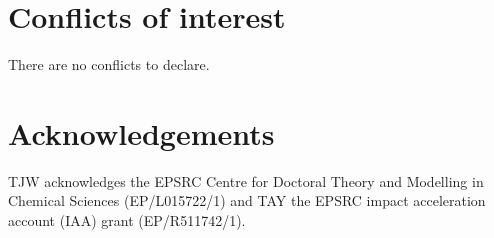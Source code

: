 \documentclass[twoside,twocolumn,9pt]{article}
\renewcommand{\refname}{Notes and references}
\begin{document}
\section*{Conflicts of interest}
There are no conflicts to declare.

\section*{Acknowledgements}
TJW acknowledges the EPSRC Centre for Doctoral Theory and Modelling in Chemical Sciences (EP/L015722/1) and TAY the EPSRC impact acceleration account (IAA) grant (EP/R511742/1). 







\scriptsize{
 } %
\end{document}
